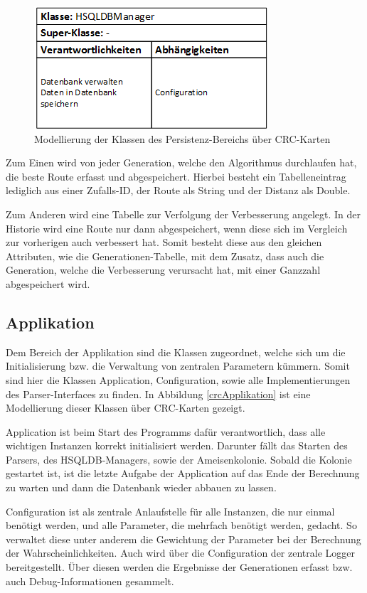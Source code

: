 \begin{figure}[h]
	\centering
	\includegraphics[width=0.4\linewidth]{images/CRC_persistenz.png}
	\caption{Modellierung der Klassen des Persistenz-Bereichs über CRC-Karten}
	\label{crcPersistenz}
\end{figure}


Zum Einen wird von jeder Generation, welche den Algorithmus durchlaufen hat, die beste Route erfasst und abgespeichert. Hierbei besteht ein Tabelleneintrag lediglich aus einer Zufalls-ID, der Route als String und der Distanz als Double. 

Zum Anderen wird eine Tabelle zur Verfolgung der Verbesserung angelegt. In der Historie wird eine Route nur dann abgespeichert, wenn diese sich im Vergleich zur vorherigen auch verbessert hat. Somit besteht diese aus den gleichen Attributen, wie die Generationen-Tabelle, mit dem Zusatz, dass auch die Generation, welche die Verbesserung verursacht hat, mit einer Ganzzahl abgespeichert wird.

\subsection{Applikation}
Dem Bereich der Applikation sind die Klassen zugeordnet, welche sich um die Initialisierung bzw. die Verwaltung von zentralen Parametern kümmern. Somit sind hier die Klassen Application, Configuration, sowie alle Implementierungen des Parser-Interfaces zu finden. In Abbildung \ref{crcApplikation} ist eine Modellierung dieser Klassen über CRC-Karten gezeigt.

Application ist beim Start des Programms dafür verantwortlich, dass alle wichtigen Instanzen korrekt initialisiert werden. Darunter fällt das Starten des Parsers, des HSQLDB-Managers, sowie der Ameisenkolonie. Sobald die Kolonie gestartet ist, ist die letzte Aufgabe der Application auf das Ende der Berechnung zu warten und dann die Datenbank wieder abbauen zu lassen.

Configuration ist als zentrale Anlaufstelle für alle Instanzen, die nur einmal benötigt werden, und alle Parameter, die mehrfach benötigt werden, gedacht. So verwaltet diese unter anderem die Gewichtung der Parameter bei der Berechnung der Wahrscheinlichkeiten. Auch wird über die Configuration der zentrale Logger bereitgestellt. Über diesen werden die Ergebnisse der Generationen erfasst bzw. auch Debug-Informationen gesammelt.

